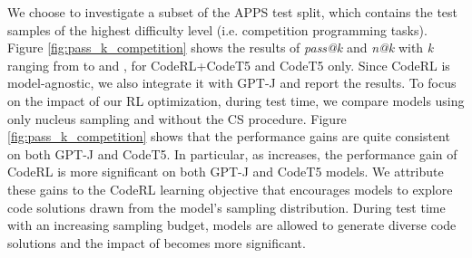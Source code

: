 \documentclass{article}
\begin{document}
We choose to investigate a subset of the APPS test split, which contains the test samples of the highest difficulty level (i.e. competition programming tasks). 
Figure \ref{fig:pass_k_competition} shows the results of \emph{pass@k} and \emph{n@k} with \emph{k} ranging from  to  and , for CodeRL+CodeT5 and CodeT5 only.
Since CodeRL is model-agnostic, we also integrate it with GPT-J \citep{gpt-j} and report the results. 
To focus on the impact of our RL optimization, during test time, we compare models using only nucleus sampling and without the CS procedure. 
Figure \ref{fig:pass_k_competition} shows that the performance gains are quite consistent on both GPT-J and CodeT5. 
In particular, as  increases, the performance gain of CodeRL is more significant on both GPT-J and CodeT5 models.
We attribute these gains to the CodeRL learning objective  that encourages models to explore code solutions drawn from the model's sampling distribution. 
During test time with an increasing  sampling budget, models are allowed to generate diverse code solutions and the impact of  becomes more significant. 
\end{document}
